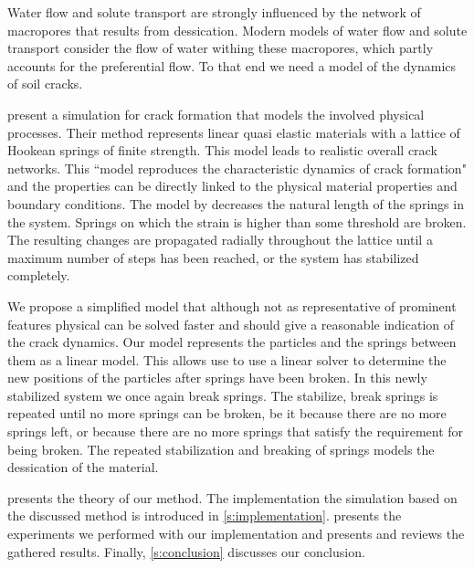 Water flow and solute transport are strongly influenced by the network of macropores that results from dessication. Modern models of water flow and solute transport consider the flow of water withing these macropores, which partly accounts for the preferential flow. To that end we need a model of the dynamics of soil cracks. 



\textcite{vogel2005studies2} present a simulation for crack formation that models the involved physical processes. Their method represents linear quasi elastic materials with a lattice of Hookean springs of finite strength. This model leads to realistic overall crack networks. This ``model reproduces the characteristic dynamics of crack formation"\cite{vogel2005studies2} and the properties can be directly linked to the physical material properties and boundary conditions. The model by \citeauthor{vogel2005studies2} decreases the natural length of the springs in the system. Springs on which the strain is higher than some threshold are broken. The resulting changes are propagated radially throughout the lattice until a maximum number of steps has been reached, or the system has stabilized completely.

We propose a simplified model that although not as representative of prominent features physical can be solved faster and should give a reasonable indication of the crack dynamics. Our model represents the particles and the springs between them as a linear model. This allows use to use a linear solver to determine the new positions of the particles after springs have been broken. In this newly stabilized system we once again break springs. The stabilize, break springs is repeated until no more springs can be broken, be it because there are no more springs left, or because there are no more springs that satisfy the requirement for being broken. The repeated stabilization and breaking of springs models the dessication of the material.

 presents the theory of our method. The implementation the simulation based on the discussed method is introduced in \cref{s:implementation}.  presents the experiments we performed with our implementation and presents and reviews the gathered results. Finally, \cref{s:conclusion} discusses our conclusion.